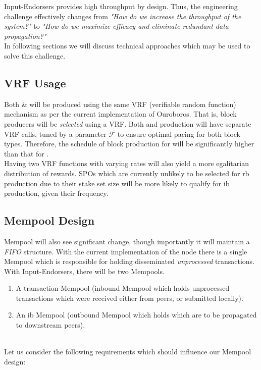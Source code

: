 \documentclass[11pt,a4paper]{article}
\begin{document}
Input-Endorsers provides high throughput by design. Thus, the engineering challenge effectively changes from 
\emph{"How do we increase the throughput of the system?"} to \emph{"How do we maximize efficacy and eliminate 
redundant data propagation?"} \\

In following sections we will discuss technical approaches which may be used to solve this challenge.

\subsection{VRF Usage}
Both  \&  will be produced using the same VRF (verifiable random function) mechanism 
as per the current implementation of Ouroboros. That is, block producers will be \emph{selected} using a VRF. 
Both  and  production will have separate VRF calls, tuned by a parameter $\mathcal{F}$ to 
ensure optimal pacing for both block types. Therefore, the schedule of block production for  will be 
significantly higher than that for . \\
Having two VRF functions with varying rates will also yield a more egalitarian distribution of rewards. 
SPOs which are currently unlikely to be selected for \gls{rb} production due to their stake set size will be more 
likely to qualify for \gls{ib} production, given their frequency.

\subsection{Mempool Design}
Mempool will also see significant change, though importantly it will maintain a \emph{FIFO} structure.
With the current implementation of the node there is a single Mempool which is responsible for
holding disseminated \emph{unprocessed} transactions. With Input-Endorsers, there will be two Mempools.

\begin{enumerate}
  \item A transaction Mempool (inbound Mempool which holds unprocessed transactions which were received either from 
        peers, or submitted locally).
  \item An \gls{ib} Mempool (outbound Mempool which holds  which are to be propagated to downstream 
        peers).
\end{enumerate} 

\ \\
Let us consider the following requirements which should influence our Mempool design:
\end{document}

